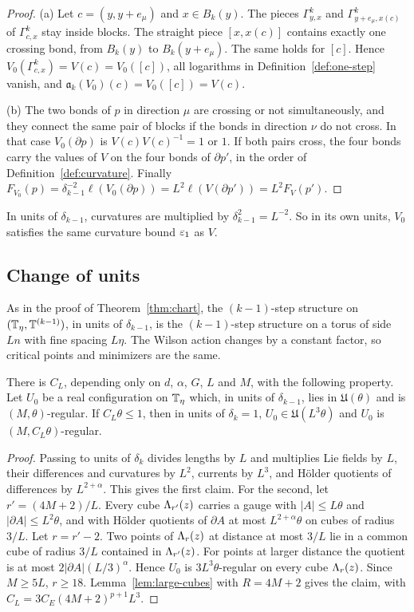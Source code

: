 \begin{proof}
(a) Let $c=(y,y+e_\mu)$ and $x\in B_k(y)$. The pieces $\Gamma^k_{y,x}$ and $\Gamma^k_{y+e_\mu,x(c)}$ of $\Gamma^k_{c,x}$ stay inside blocks. The straight piece $[x,x(c)]$ contains exactly one crossing bond, from $B_k(y)$ to $B_k(y+e_\mu)$. The same holds for $[c]$. Hence $V_0(\Gamma^k_{c,x})=V(c)=V_0([c])$, all logarithms in Definition~\ref{def:one-step} vanish, and $\mathfrak a_k(V_0)(c)=V_0([c])=V(c)$.

(b) The two bonds of $p$ in direction $\mu$ are crossing or not simultaneously, and they connect the same pair of blocks if the bonds in direction $\nu$ do not cross. In that case $V_0(\partial p)$ is $V(c)V(c)^{-1}=1$ or $1$. If both pairs cross, the four bonds carry the values of $V$ on the four bonds of $\partial p'$, in the order of Definition~\ref{def:curvature}. Finally $F_{V_0}(p)=\delta_{k-1}^{-2}\ell(V_0(\partial p))=L^2\ell(V(\partial p'))=L^2F_V(p')$.
\end{proof}

In units of $\delta_{k-1}$, curvatures are multiplied by $\delta_{k-1}^2=L^{-2}$. So in its own units, $V_0$ satisfies the same curvature bound $\varepsilon_1$ as $V$.

\subsection{Change of units}

As in the proof of Theorem~\ref{thm:chart}, the $(k-1)$-step structure on $(\mathbb T_\eta,\mathbb T^{(k-1)})$, in units of $\delta_{k-1}$, is the $(k-1)$-step structure on a torus of side $Ln$ with fine spacing $L\eta$. The Wilson action changes by a constant factor, so critical points and minimizers are the same.

\begin{lemma}\label{lem:units}
There is $C_L$, depending only on $d$, $\alpha$, $G$, $L$ and $M$, with the following property. Let $U_0$ be a real configuration on $\mathbb T_\eta$ which, in units of $\delta_{k-1}$, lies in $\mathfrak U(\theta)$ and is $(M,\theta)$-regular. If $C_L\theta\le1$, then in units of $\delta_k=1$, $U_0\in\mathfrak U(L^3\theta)$ and $U_0$ is $(M,C_L\theta)$-regular.
\end{lemma}

\begin{proof}
Passing to units of $\delta_k$ divides lengths by $L$ and multiplies Lie fields by $L$, their differences and curvatures by $L^2$, currents by $L^3$, and H\"older quotients of differences by $L^{2+\alpha}$. This gives the first claim. For the second, let $r'=(4M+2)/L$. Every cube $\Lambda_{r'}(z)$ carries a gauge with $|A|\le L\theta$ and $|\partial A|\le L^2\theta$, and with H\"older quotients of $\partial A$ at most $L^{2+\alpha}\theta$ on cubes of radius $3/L$. Let $r=r'-2$. Two points of $\Lambda_r(z)$ at distance at most $3/L$ lie in a common cube of radius $3/L$ contained in $\Lambda_{r'}(z)$. For points at larger distance the quotient is at most $2|\partial A|(L/3)^\alpha$. Hence $U_0$ is $3L^3\theta$-regular on every cube $\Lambda_r(z)$. Since $M\ge5L$, $r\ge18$. Lemma~\ref{lem:large-cubes} with $R=4M+2$ gives the claim, with $C_L=3C_E(4M+2)^{p+1}L^3$.
\end{proof}

